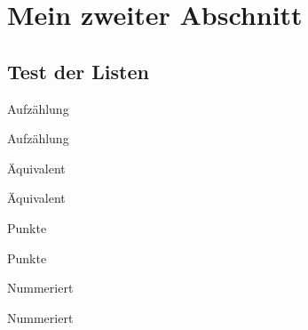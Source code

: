 
\thispagestyle{empty}
\section{Mein zweiter Abschnitt}\label{sec:zweiter-abschnitt}
\subsection{Test der Listen}\label{subsec:listen}
\begin{myenumerate}
\item
Aufzählung
\item
Aufzählung
\end{myenumerate}
\begin{myequivalent}
\item
Äquivalent
\item
Äquivalent
\end{myequivalent}
\begin{myitemize}
\item
Punkte
\item
Punkte
\end{myitemize}
\begin{mynumber}
\item
Nummeriert
\item
Nummeriert
\end{mynumber}
